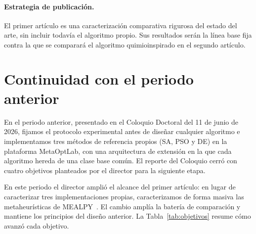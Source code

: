\documentclass[11pt,letterpaper]{article}
\begin{document}
\paragraph{Estrategia de publicación.} El primer artículo es una caracterización comparativa rigurosa del estado del arte, sin incluir todavía el algoritmo propio. Sus resultados serán la línea base fija contra la que se comparará el algoritmo quimioinspirado en el segundo artículo.

\section{Continuidad con el periodo anterior}\label{sec:continuidad}

En el periodo anterior, presentado en el Coloquio Doctoral del 11 de junio de 2026, fijamos el protocolo experimental antes de diseñar cualquier algoritmo e implementamos tres métodos de referencia propios (SA, PSO y DE) en la plataforma MetaOptLab, con una arquitectura de extensión en la que cada algoritmo hereda de una clase base común. El reporte del Coloquio cerró con cuatro objetivos planteados por el director para la siguiente etapa.

En este periodo el director amplió el alcance del primer artículo: en lugar de caracterizar tres implementaciones propias, caracterizamos de forma masiva las metaheurísticas de MEALPY~\cite{mealpy2023}. El cambio amplía la batería de comparación y mantiene los principios del diseño anterior. La Tabla~\ref{tab:objetivos} resume cómo avanzó cada objetivo.
\end{document}
